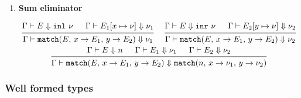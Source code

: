 \documentclass{article}
\begin{document}
\begin{enumerate}
  \item \textbf{Sum eliminator}
  \begin{spreadlines}{2em}
  \begin{gather*}
    \begin{prooftree}
      \hypo{\Gamma \vdash E \Downarrow \inl \,\, \nu}
      \hypo{\Gamma \vdash E_1[x \mapsto \nu] \Downarrow \nu_1}
      \infer2{\Gamma \vdash 
        \match(E, \, x \rightarrow E_1, \, y \rightarrow E_2)
        \Downarrow \nu_1}
    \end{prooftree}  
    ~ \quad
   \begin{prooftree}
     \hypo{\Gamma \vdash E \Downarrow \inr \,\, \nu}
     \hypo{\Gamma \vdash E_2[y \mapsto \nu] \Downarrow \nu_2}
     \infer2{\Gamma \vdash 
       \match(E, \, x \rightarrow E_1, \, y \rightarrow E_2)
       \Downarrow \nu_2}
   \end{prooftree}  
   \\
   \begin{prooftree}
    \hypo{\Gamma \vdash E \Downarrow n}
      \hypo{\Gamma \vdash E_1 \Downarrow \nu_1}
      \hypo{\Gamma \vdash E_2 \Downarrow \nu_2}
      \infer3{\Gamma \vdash \match(E, \, x \rightarrow E_1, \, y \rightarrow E_2) 
               \Downarrow
               \match(n, \, x \rightarrow \nu_1, \, y \rightarrow \nu_2) 
               }
   \end{prooftree}  
  \end{gather*}
\end{spreadlines}

\end{enumerate}


\subsubsection{Well formed types}

\end{document}
